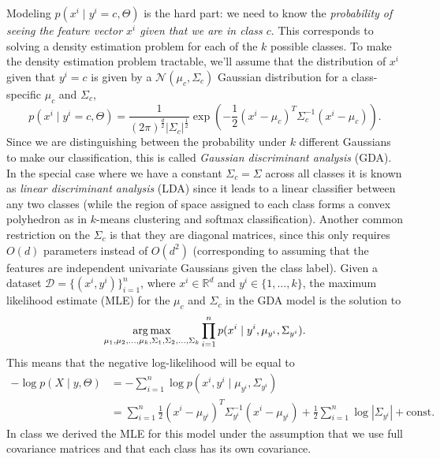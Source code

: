 \documentclass{article}
\def\R{\mathbb{R}}
\def\argmax{\mathop{\rm arg\,max}}
\newcommand{\alignStar}[1]{\begin{align*}#1\end{align*}}
\def\half{\frac 1 2}
\def\cond{\; | \;}
\begin{document}
Modeling $p(x^i \cond y^i =c, \Theta)$ is the hard part: we need to know the \emph{probability of seeing the feature vector $x^i$ given that we are in class $c$}. This corresponds to solving a density estimation problem for each of the $k$ possible classes. 
To make the density estimation problem tractable, we'll assume that the distribution of $x^i$ given that $y^i=c$ is given by a $\mathcal{N}(\mu_c,\Sigma_c)$ Gaussian distribution for a class-specific $\mu_c$ and $\Sigma_c$,
\[
p(x^i \cond y^i=c, \Theta) = \frac{1}{(2\pi)^{\frac{d}{2}}|\Sigma_c|^{\half}}\exp\left(-\half (x^i-\mu_c)^T\Sigma_c^{-1}(x^i-\mu_c)\right).
\]
Since we are distinguishing between the probability under $k$ different Gaussians to make our classification, this is called \emph{Gaussian discriminant analysis} (GDA). In the special case where we have a constant $\Sigma_c = \Sigma$ across all classes it is known as \emph{linear discriminant analysis} (LDA) since it leads to a linear classifier between any two classes (while the region of space assigned to each class forms a convex polyhedron as in $k$-means clustering and softmax classification). Another common restriction on the $\Sigma_c$ is that they are diagonal matrices, since this only requires $O(d)$ parameters instead of $O(d^2)$ (corresponding to assuming that the features are independent univariate Gaussians given the class label).
Given a dataset $\mathcal{D}=\{(x^i, y^i)\}_{i=1}^n$, where $x^i\in\R^d$ and $y^i\in\{1,\ldots,k\}$, the maximum likelihood estimate (MLE) for the $\mu_c$ and $\Sigma_c$ in the GDA model is the solution to
\[
\argmax_{\mu_1,\mu_2,\dots,\mu_k,\Sigma_1,\Sigma_2,\dots,\Sigma_k} \prod_{i=1}^n p(x^i \cond y^i, \mu_{y^i},\Sigma_{y^i}).
\]
This means that the negative log-likelihood will be  equal to
\alignStar{
- \log p(X\cond y,\Theta) & = -\sum_{i=1}^n \log p(x^i , y^i \cond \mu_{y^i},\Sigma_{y^i})\\
& = \sum_{i=1}^n \frac{1}{2}(x^i - \mu_{y^i})^T\Sigma_{y^i}^{-1}(x^i - \mu_{y^i}) + \half\sum_{i=1}^n \log|\Sigma_{y^i}| + \text{const.}
}
In class we derived the MLE for this model under the assumption that we use full covariance matrices and that each class has its own covariance.
\end{document}
